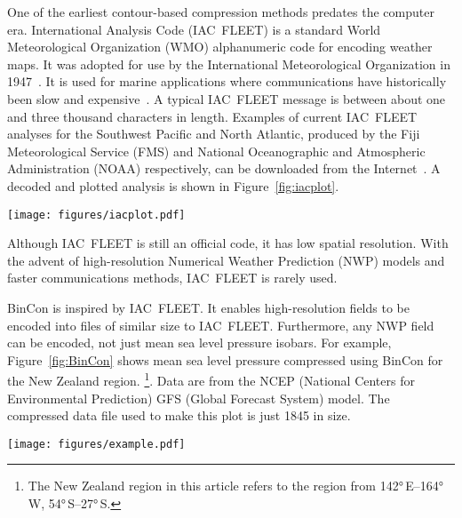 \documentclass[12pt,a4paper]{article}
\begin{document}
One of the earliest contour-based compression methods predates the
computer era. International Analysis Code (IAC~FLEET) is a standard
World Meteorological Organization (WMO) alphanumeric code for encoding
weather maps. It was adopted for use by the International Meteorological
Organization in 1947~\citep[Resolution 156, p.~161]{imo1947}. It is used for
marine applications where communications have historically been slow and
expensive~\citep[pp.~87--90]{wmo2019a}. A typical IAC~FLEET message is
between about one and three thousand characters in length. Examples of current
IAC~FLEET analyses for the Southwest Pacific and North Atlantic,
produced by the Fiji Meteorological Service (FMS) and National
Oceanographic and Atmospheric Administration (NOAA) respectively, can
be downloaded from the Internet~\citep{fms2023, noaa2023}. A decoded and
plotted analysis is shown in Figure~\ref{fig:iacplot}.

\begin{figure*}
\centering
\texttt{[image: figures/iacplot.pdf]}
\caption{\label{fig:iacplot}Isobars plotted from Fleet Code using
OpenCPN~\citep{opencpn2023} The yellow lines are easterly wind troughs, and the
orange line is a frontal system.}
\end{figure*}

Although IAC~FLEET is still an official code, it has low spatial resolution.
With the advent of high-resolution Numerical Weather Prediction (NWP) models
and faster communications methods, IAC~FLEET is rarely used.

BinCon is inspired by IAC~FLEET. It enables high-resolution fields to be
encoded into files of similar size to IAC~FLEET. Furthermore, any NWP field can
be encoded, not just mean sea level pressure isobars. For example,
Figure~\ref{fig:BinCon} shows mean sea level pressure compressed using BinCon
for the New Zealand region. \footnote{The New Zealand region in this article
refers to the region from \ang{142}\,E--\ang{164}\,W,
\ang{54}\,S--\ang{27}\,S.}. Data are from the NCEP (National Centers for
Environmental Prediction) GFS (Global Forecast System) model. The compressed
data file used to make this plot is just \SI{1845}{\byte} in size.

\begin{figure*}
\centering
\texttt{[image: figures/example.pdf]}
\caption{\label{fig:BinCon}Mean sea level pressure forecast valid at
1200\,UTC, 5 January 2023. Data are compressed using the BinCon
method.}
\end{figure*}
\end{document}
